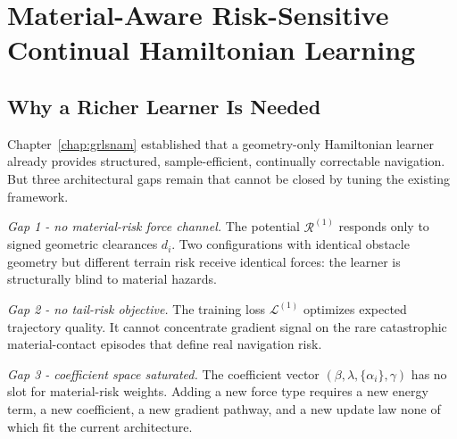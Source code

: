 
\chapter{Material-Aware Risk-Sensitive Continual Hamiltonian Learning}
\label{chap:material}

\providecommand{\Ham}{\mathcal{H}}
\providecommand{\Potential}{\mathcal{R}}
\providecommand{\PhaseState}{z}
\providecommand{\Pos}{q}
\providecommand{\Mom}{p}
\providecommand{\Mass}{\mathrm{M}}
\providecommand{\J}{\mathbb{J}}

\section{Why a Richer Learner Is Needed}
\label{sec:ch4:motivation}

Chapter~\ref{chap:grlsnam} established that a geometry-only Hamiltonian
learner already provides structured, sample-efficient, continually
correctable navigation.
But three architectural gaps remain that cannot be closed by tuning the
existing framework.

\emph{Gap 1 - no material-risk force channel.}
The potential $\Potential^{(1)}$ responds only to signed geometric
clearances $d_i$.
Two configurations with identical obstacle geometry but different terrain
risk receive identical forces: the learner is structurally blind to
material hazards.

\emph{Gap 2 - no tail-risk objective.}
The training loss $\mathcal{L}^{(1)}$ optimizes expected trajectory
quality.
It cannot concentrate gradient signal on the rare catastrophic
material-contact episodes that define real navigation risk.

\emph{Gap 3 - coefficient space saturated.}
The coefficient vector $(\beta,\lambda,\{\alpha_i\},\gamma)$ has no
slot for material-risk weights.
Adding a new force type requires a new energy term, a new coefficient,
a new gradient pathway, and a new update law none of which fit the
current architecture.

